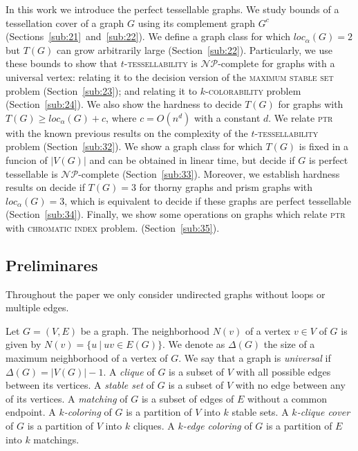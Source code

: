\documentclass[9pt]{entcs} \usepackage{entcsmacro}
\begin{document}
In this work we introduce the perfect tessellable graphs.
We study bounds of a tessellation cover of a graph $G$ using its complement graph $G^c$
(Sections~\ref{sub:21}~and~\ref{sub:22}).
We define a graph class for which $loc_\alpha(G) = 2$ but $T(G)$ can grow arbitrarily large (Section~\ref{sub:22}).
Particularly, we use these bounds to show that \textsc{$t$-tessellability} is $\mathcal{NP}$-complete for graphs with a universal vertex: relating it to the decision version of the \textsc{maximum stable set} problem (Section~\ref{sub:23}); and relating it to \textsc{$k$-colorability} problem (Section~\ref{sub:24}).
We also show the hardness to decide $T(G)$ for graphs with $T(G) \geq loc_\alpha(G) + c$, where $c = O(n^d)$ with a constant $d$.
We relate \textsc{ptr} with the known previous results on the complexity of the
\textsc{$t$-tessellability} problem (Section~\ref{sub:32}).
We show a graph class for which $T(G)$ is fixed in a funcion of $|V(G)|$ and can be obtained in linear time, but decide if $G$ is perfect tessellable is $\mathcal{NP}$-complete (Section~\ref{sub:33}).
Moreover, we establish hardness results on decide if $T(G) = 3$ for thorny graphs and prism graphs with $loc_{\alpha}(G)=3$, which is equivalent to decide if these graphs are perfect tessellable (Section~\ref{sub:34}).
Finally, we show some operations on graphs which relate \textsc{ptr} with  \textsc{chromatic index} problem. (Section~\ref{sub:35}).


\subsection{Preliminares}

Throughout the paper we only consider undirected graphs without loops or multiple edges. 

Let $G=(V, E)$ be a graph.
The neighborhood $N(v)$ of a vertex $v \in V$ of $G$ is given by $N(v)=\{u\ |\ uv \in E(G)\}$.
We denote as $\Delta(G)$ the size of a maximum neighborhood of a vertex of $G$. %
We say that a graph is \textit{universal} if $\Delta(G) = |V(G)|-1$.
A \textit{clique} of $G$ is a subset of $V$ with all possible edges between its vertices.
A \textit{stable set} of $G$ is a subset of $V$ with no edge between any of its vertices.
A \textit{matching} of $G$ is a subset of edges of $E$  without a common endpoint.
A \textit{$k$-coloring} of $G$ is a partition of $V$ into $k$ stable sets.
A \textit{$k$-clique cover} of $G$ is a partition of $V$ into $k$ cliques.
A \textit{$k$-edge coloring} of $G$ is a partition of $E$ into $k$ matchings.
\end{document}
